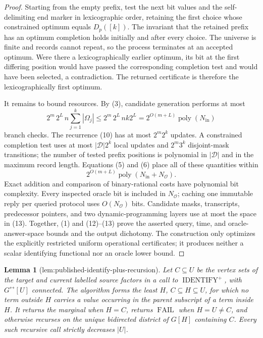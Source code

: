 \documentclass{article}
\newtheorem{lemma}{Lemma}
\begin{document}
\begin{proof}
Starting from the empty prefix, test the next bit values and the self-delimiting end marker in lexicographic order, retaining the first choice whose constrained optimum equals \(D_p([k])\).  The invariant that the retained prefix has an optimum completion holds initially and after every choice.  The universe is finite and records cannot repeat, so the process terminates at an accepted optimum.  Were there a lexicographically earlier optimum, its bit at the first differing position would have passed the corresponding completion test and would have been selected, a contradiction.  The returned certificate is therefore the lexicographically first optimum.

It remains to bound resources.  By (3), candidate generation performs at most
\[
  2^m\,2^L\,n\sum_{j=1}^{k}|\Omega_j|
  \leq 2^m\,2^L\,nk2^L
  =2^{O(m+L)}\operatorname{poly}(N_{\mathrm{in}}) \tag{12}
\]
branch checks.  The recurrence (10) has at most \(2^m2^k\) updates.  A constrained completion test uses at most \(|\mathcal D|2^k\) local updates and \(2^m3^k\) disjoint-mask transitions; the number of tested prefix positions is polynomial in \(|\mathcal D|\) and in the maximum record length.  Equations (5) and (6) place all of these quantities within
\[
  2^{O(m+L)}\operatorname{poly}(N_{\mathrm{in}}+N_{\mathcal O}). \tag{13}
\]
Exact addition and comparison of binary-rational costs have polynomial bit complexity.  Every inspected oracle bit is included in \(N_{\mathcal O}\); caching one immutable reply per queried protocol uses \(O(N_{\mathcal O})\) bits.  Candidate masks, transcripts, predecessor pointers, and two dynamic-programming layers use at most the space in (13).  Together, (1) and (12)--(13) prove the asserted query, time, and oracle-answer-space bounds and the output dichotomy.  The construction only optimizes the explicitly restricted uniform operational certificates; it produces neither a scalar identifying functional nor an oracle lower bound.
\end{proof}

\begin{lemma}[lem:published-identify-plus-recursion]\label{lem:published-identify-plus-recursion}
Let \(C\subseteq U\) be the vertex sets of the target and current labelled source factors in a call to \(\operatorname{IDENTIFY}^{+}\), with \(G^{\leftrightarrow}[U]\) connected.  The algorithm forms the least \(H\), \(C\subseteq H\subseteq U\), for which no term outside \(H\) carries a value occurring in the parent subscript of a term inside \(H\).  It returns the marginal when \(H=C\), returns \(\operatorname{FAIL}\) when \(H=U\ne C\), and otherwise recurses on the unique bidirected district of \(G[H]\) containing \(C\).  Every such recursive call strictly decreases \(|U|\).
\end{lemma}
\end{document}
